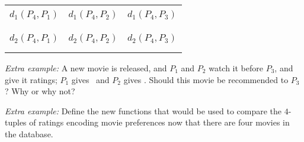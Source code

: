 \begin{tabularx}{\textwidth}{|X|X|X|}
\hline &&\\
$d_1(P_4, P_1)$ & $d_1(P_4, P_2)$ & $d_1(P_4, P_3)$ \\
&&\\
&&\\
\hline&&\\
$d_2(P_4, P_1)$ & $d_2(P_4, P_2)$ & $d_2(P_4, P_3)$ \\
&&\\
&&\\
\hline
\end{tabularx}

\vfill


{\it Extra example:} A new movie is released, and $P_1$ and $P_2$ watch it before $P_3$, and give it
ratings; $P_1$ gives \cmark~and $P_2$ gives \xmark.
Should this movie be recommended to $P_3$? Why or why not?

{\it Extra example:} Define the new functions that would be used to compare the $4$-tuples of ratings encoding
movie preferences now that there are four movies in the database.

\vfill